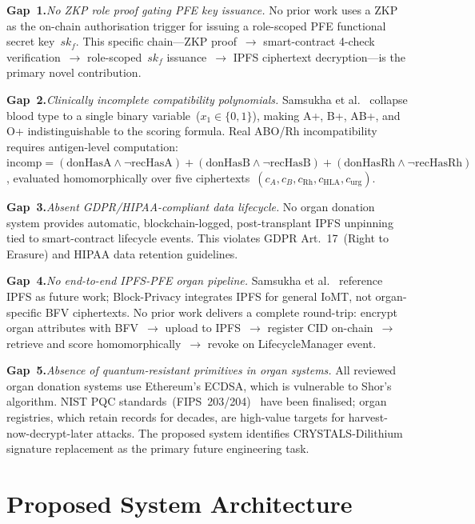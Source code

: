 \documentclass[10pt,twocolumn,a4paper]{article}
\begin{document}
\textbf{Gap~1.}\enspace\textit{No ZKP role proof gating PFE key issuance.}
No prior work uses a ZKP as the on-chain authorisation trigger for issuing a
role-scoped PFE functional secret key~$sk_f$. This specific chain---ZKP proof~$\to$
smart-contract 4-check verification~$\to$ role-scoped~$sk_f$ issuance~$\to$ IPFS
ciphertext decryption---is the primary novel contribution.

\textbf{Gap~2.}\enspace\textit{Clinically incomplete compatibility polynomials.}
Samsukha et al.~\cite{samsukha2025} collapse blood type to a single binary
variable~($x_1\in\{0,1\}$), making A+, B+, AB+, and O+ indistinguishable to the
scoring formula. Real ABO/Rh incompatibility requires antigen-level computation:
$\mathrm{incomp} = (\mathrm{donHasA}\wedge\neg\mathrm{recHasA}) +
(\mathrm{donHasB}\wedge\neg\mathrm{recHasB}) + (\mathrm{donHasRh}\wedge\neg\mathrm{recHasRh})$,
evaluated homomorphically over five ciphertexts~$(c_{A}, c_{B}, c_{\mathrm{Rh}},
c_{\mathrm{HLA}}, c_{\mathrm{urg}})$.

\textbf{Gap~3.}\enspace\textit{Absent GDPR/HIPAA-compliant data lifecycle.}
No organ donation system provides automatic, blockchain-logged, post-transplant
IPFS unpinning tied to smart-contract lifecycle events. This violates GDPR
Art.~17~(Right to Erasure) and HIPAA data retention guidelines.

\textbf{Gap~4.}\enspace\textit{No end-to-end IPFS-PFE organ pipeline.}
Samsukha et al.~\cite{samsukha2025} reference IPFS as future work; Block-Privacy
integrates IPFS for general IoMT, not organ-specific BFV ciphertexts. No prior work
delivers a complete round-trip: encrypt organ attributes with BFV~$\to$ upload to
IPFS~$\to$ register CID on-chain~$\to$ retrieve and score homomorphically~$\to$
revoke on LifecycleManager event.

\textbf{Gap~5.}\enspace\textit{Absence of quantum-resistant primitives in organ systems.}
All reviewed organ donation systems use Ethereum's ECDSA, which is
vulnerable to Shor's algorithm. NIST PQC standards~(FIPS~203/204)~\cite{nist2024fips203,nist2024fips204}
have been finalised; organ registries, which retain records for decades, are
high-value targets for harvest-now-decrypt-later attacks. The proposed system
identifies CRYSTALS-Dilithium signature replacement as the primary future
engineering task.

\section{Proposed System Architecture}
\label{sec:arch}
\end{document}
